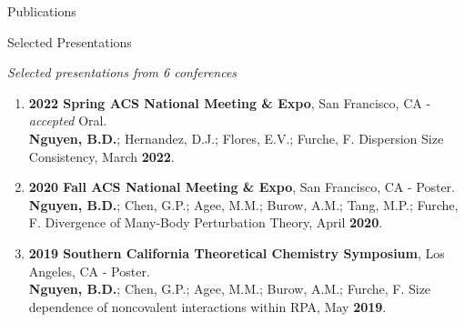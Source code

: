 \documentclass{resume} %
\begin{document}
\begin{rSection}{Publications}
\begin{enumerate}
  
\end{enumerate}

\end{rSection}

\begin{rSection}{Selected Presentations}

\textit{Selected presentations from 6 conferences}

  \begin{enumerate}

  \item \textbf{2022 Spring ACS National Meeting \& Expo}, San Francisco, CA - \textit{accepted} Oral. \\
  \textbf{Nguyen, B.D.}; Hernandez, D.J.; Flores, E.V.; Furche, F.
  Dispersion Size Consistency, March \textbf{2022}.
    
  \item \textbf{2020 Fall ACS National Meeting \& Expo}, San Francisco, CA - Poster. \\
  \textbf{Nguyen, B.D.}; Chen, G.P.; Agee, M.M.; Burow, A.M.; Tang, M.P.;
  Furche, F. Divergence of Many-Body Perturbation Theory, April \textbf{2020}.
  
  \item \textbf{2019 Southern California Theoretical Chemistry Symposium}, Los Angeles, CA - Poster. \\
  \textbf{Nguyen, B.D.}; Chen, G.P.; Agee, M.M.; Burow, A.M.; Furche, F.  
  Size dependence of noncovalent interactions within RPA, May \textbf{2019}.
  \end{enumerate}
  
\end{rSection}
\end{document}
